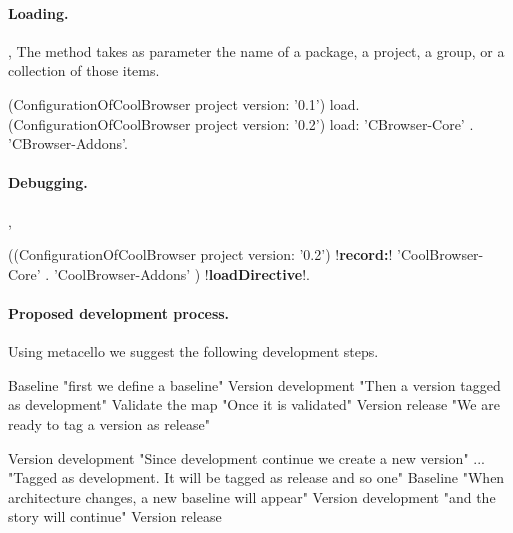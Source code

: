 \documentclass[a4paper,10pt,twoside]{book}
\begin{document}
\paragraph{Loading.} , 
The   method takes as parameter the name of a package, a project, a group, or a collection of those items.

\begin{code}{}
(ConfigurationOfCoolBrowser project version: '0.1') load.
(ConfigurationOfCoolBrowser project version: '0.2') load: {'CBrowser-Core' . 'CBrowser-Addons'}.
\end{code}

\paragraph{Debugging.}
,  

\begin{code}{}
((ConfigurationOfCoolBrowser project version: '0.2') !\textbf{record:}! 
  		{ 'CoolBrowser-Core' .
		'CoolBrowser-Addons' }) !\textbf{loadDirective}!.
\end{code} 


\paragraph{Proposed development process.}
Using metacello we suggest the following development steps.

\begin{code}{}
Baseline						"first we define a baseline"
Version development			"Then a version tagged as development"
Validate the map				"Once it is validated"
Version release				"We are ready to tag a version as release"	

Version development			"Since development continue we create a new version"
...							"Tagged as development. It will be tagged as release and so one"
Baseline 					"When architecture changes, a new baseline will appear"
Version development			"and the story will continue"
Version release

\end{code}

\ifx\wholebook\relax\else
    
    
\end{document}
